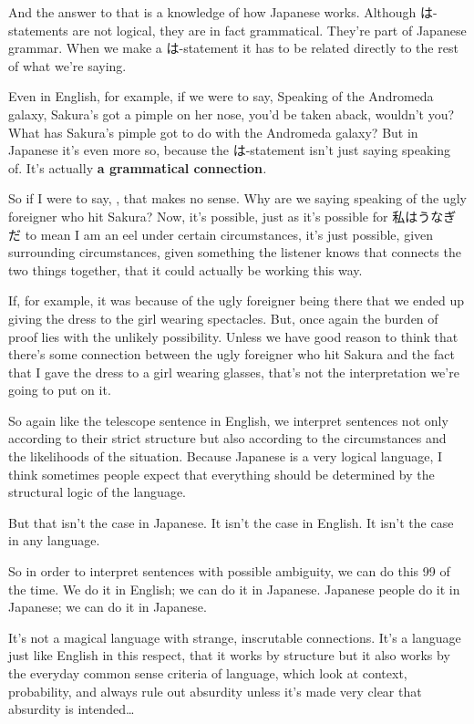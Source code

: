 And the answer to that is a knowledge of how Japanese works. Although は-statements are not logical, they are in fact grammatical. They're part of Japanese grammar. When we make a は-statement it has to be related directly to the rest of what we're saying.

Even in English, for example, if we were to say, Speaking of the Andromeda galaxy, Sakura's got a pimple on her nose, you'd be taken aback, wouldn't you? What has Sakura's pimple got to do with the Andromeda galaxy? But in Japanese it's even more so, because the は-statement isn't just saying speaking of. It's actually {\bf a grammatical connection}{\em .}

So if I were to say, , that makes no sense. Why are we saying speaking of the ugly foreigner who hit Sakura? Now, it's possible, just as it's possible for 私はうなぎだ to mean I am an eel under certain circumstances, it's just possible, given surrounding circumstances, given something the listener knows that connects the two things together, that it could actually be working this way.

If, for example, it was because of the ugly foreigner being there that we ended up giving the dress to the girl wearing spectacles. But, once again the burden of proof lies with the unlikely possibility. Unless we have good reason to think that there's some connection between the ugly foreigner who hit Sakura and the fact that I gave the dress to a girl wearing glasses, that's not the interpretation we're going to put on it.

So again like the telescope sentence in English, we interpret sentences not only according to their strict structure but also according to the circumstances and the likelihoods of the situation. Because Japanese is a very logical language, I think sometimes people expect that everything should be determined by the structural logic of the language.

But that isn't the case in Japanese. It isn't the case in English. It isn't the case in any language.

So in order to interpret sentences with possible ambiguity, we can do this 99 of the time. We do it in English; we can do it in Japanese. Japanese people do it in Japanese; we can do it in Japanese.

It's not a magical language with strange, inscrutable connections. It's a language just like English in this respect, that it works by structure but it also works by the everyday common sense criteria of language, which look at context, probability, and always rule out absurdity unless it's made very clear that absurdity is intended\ldots{}

